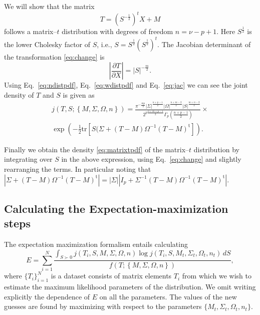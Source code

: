 \documentclass[english,listof=totoc]{scrartcl}
\begin{document}
We will show that the matrix
\begin{equation}
T=(S^{-\frac{1}{2}})^{t}X+M\label{eq:change}
\end{equation}
follows a matrix--$t$ distribution with degrees of freedom $n=\nu-p+1$. Here $S^{\frac{1}{2}}$ is the lower Cholesky factor of $S$, i.e., $S=S^{\frac{1}{2}}(S^{\frac{1}{2}})^t$. The Jacobian determinant of the transformation \eqref{eq:change} is
\begin{equation}
\left|\frac{\partial T}{\partial X}\right|=|S|^{-\frac{m}{2}}.\label{eq:jac}
\end{equation}
Using Eq.~\eqref{eq:ndistpdf}, Eq.~\eqref{eq:wdistpdf} and Eq.~\eqref{eq:jac} we can see the joint density of $T$ and $S$ is given as
\begin{equation}
\begin{split}j(T,S;\left\{M,\Sigma,\Omega,n\right\})=\frac{\pi^{-\frac{mp}{2}}|\Sigma|^{\frac{n+p-1}{2}}|\Omega|^{\frac{n+m-2}{2}}|S|^{\frac{m+n-2}{2}}}{2^{p\frac{n+m+p-1}{2}}\Gamma_{p}(\frac{n+p-1}{2})}\times\\
\exp\left(-\frac{1}{2}\textrm{tr}\left[S(\Sigma+(T-M)\Omega^{-1}(T-M)^{\textrm{t}}\right]\right).
\end{split}
\label{eq:jointpdf}
\end{equation}

Finally we obtain the density \eqref{eq:matrixtpdf} of the matrix--$t$ distribution
by integrating over $S$ in the above expression, using Eq.~\eqref{eq:change} and slightly
rearranging the terms. In particular noting that
$|\Sigma+(T-M)\Omega^{-1}(T-M)^{\textrm{t}}|=|\Sigma||I_p+\Sigma^{-1}(T-M)\Omega^{-1}(T-M)^{\textrm{t}}|$.

\subsection{Calculating the Expectation-maximization steps}

The expectation maximization formalism entails calculating 
\begin{equation}
E=\sum_{i=1}^{N}\frac{\int_{S\succ 0}j(T_{i},S,M,\Sigma,\Omega,n)\log j(T_{i},S,M_{t},\Sigma_{t},\Omega_{t},n_{t})\,dS}{f(T;\left\{M,\Sigma,\Omega,n\right\})},\label{eq:expdef}
\end{equation}
where $\{T_i\}_{i=1}^N$ is a dataset consists of matrix elements $T_i$ from which we wish to estimate the maximum likelihood parameters of the distribution. We omit writing explicitly the dependence of $E$ on all the parameters. The values of the new guesses are found by maximizing with respect to the parameters $\{M_{t},\Sigma_{t},\Omega_{t},n_{t}\}$.
\end{document}

